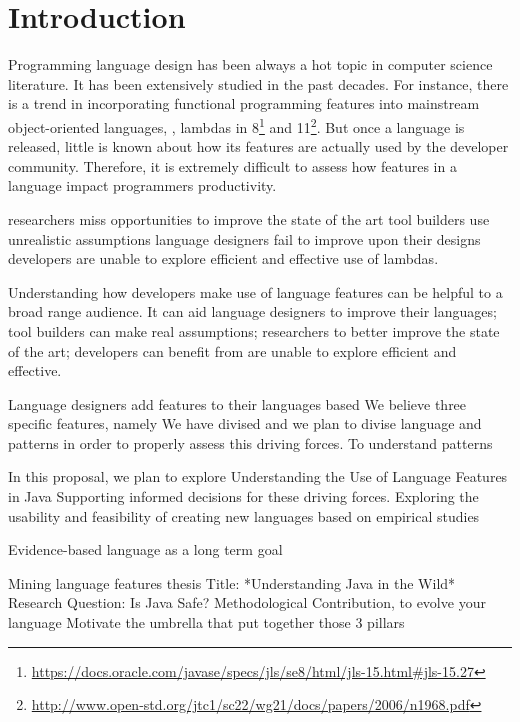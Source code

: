 
\chapter{Introduction}

\label{ch:introduction}

Programming language design has been always a hot topic in computer science literature.
It has been extensively studied in the past decades.
For instance, there is a trend in incorporating functional programming features into mainstream object-oriented languages, \eg{}, lambdas in \java{} 8\footnote{\url{https://docs.oracle.com/javase/specs/jls/se8/html/jls-15.html\#jls-15.27}} and \cpp{}11\footnote{\url{http://www.open-std.org/jtc1/sc22/wg21/docs/papers/2006/n1968.pdf}}.
But once a language is released, little is known about how its features are actually used by the developer community.
Therefore, it is extremely difficult to assess how features in a language impact programmers productivity.


researchers miss opportunities to improve the state of the art
tool builders use unrealistic assumptions
language designers fail to improve upon their designs
developers are unable to explore efficient and effective use of lambdas.

Understanding how developers make use of language features can be helpful to a broad range audience.
It can aid language designers to improve their languages;
tool builders can make real assumptions;
researchers to better improve the state of the art;
developers can benefit from are unable to explore efficient and effective.

Language designers add features to their languages based
We believe 
three specific features, namely
We have divised and we plan to divise language and \api{} patterns in order to properly assess this driving forces.
To understand patterns

In this proposal, we plan to explore 
Understanding the Use of Language Features in Java
Supporting informed decisions for these driving forces.
Exploring the usability and feasibility of creating new languages based on empirical studies



Evidence-based language as a long term goal

Mining language features thesis
Title: *Understanding Java in the Wild*
Research Question: Is Java Safe?
Methodological Contribution, to evolve your language
Motivate the umbrella that put together those 3 pillars



